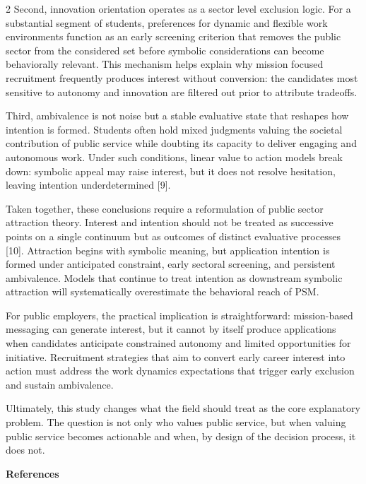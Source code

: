 \begin{multicols}{2}
Second, innovation orientation operates as a sector level exclusion
logic. For a substantial segment of students, preferences for dynamic
and flexible work environments function as an early screening criterion
that removes the public sector from the considered set before symbolic
considerations can become behaviorally relevant. This mechanism helps
explain why mission focused recruitment frequently produces interest
without conversion: the candidates most sensitive to autonomy and
innovation are filtered out prior to attribute tradeoffs.

Third, ambivalence is not noise but a stable evaluative state that
reshapes how intention is formed. Students often hold mixed judgments
valuing the societal contribution of public service while doubting its
capacity to deliver engaging and autonomous work. Under such conditions,
linear value to action models break down: symbolic appeal may raise
interest, but it does not resolve hesitation, leaving intention
underdetermined {[}9{]}.

Taken together, these conclusions require a reformulation of public
sector attraction theory. Interest and intention should not be treated
as successive points on a single continuum but as outcomes of distinct
evaluative processes {[}10{]}. Attraction begins with symbolic meaning,
but application intention is formed under anticipated constraint, early
sectoral screening, and persistent ambivalence. Models that continue to
treat intention as downstream symbolic attraction will systematically
overestimate the behavioral reach of PSM.

For public employers, the practical implication is straightforward:
mission-based messaging can generate interest, but it cannot by itself
produce applications when candidates anticipate constrained autonomy and
limited opportunities for initiative. Recruitment strategies that aim to
convert early career interest into action must address the work dynamics
expectations that trigger early exclusion and sustain ambivalence.

Ultimately, this study changes what the field should treat as the core
explanatory problem. The question is not only who values public service,
but when valuing public service becomes actionable and when, by design
of the decision process, it does not.
\end{multicols}

\begin{center}
{\bfseries References}
\end{center}

